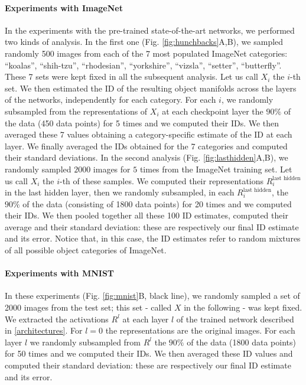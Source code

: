\documentclass{article}
\begin{document}
\paragraph{Experiments with ImageNet}

In the experiments with the pre-trained state-of-the-art networks, we performed two kinds of analysis. In the first one (Fig. \ref{fig:hunchbacks}A,B), we sampled randomly 500 images from each of the 7 most populated ImageNet categories: ``koalas'', ``shih-tzu'', ``rhodesian'', ``yorkshire'', ``vizsla'', ``setter'', ``butterfly''. These 7 sets were kept fixed in all the subsequent analysis. Let us call $X_i$ the $i$-th set.
We then estimated the ID of the resulting object manifolds across the layers of the networks, independently for each category. 
For each $i$, we randomly subsampled from the representations of $X_i$ at each checkpoint layer the $90\%$ of the data (450 data points) for 5 times and we computed their IDs. We then averaged these 7 values obtaining a category-specific estimate of the ID at each layer. 
We finally averaged the IDs obtained for the 7 categories and computed their standard deviations.
In the second analysis (Fig. \ref{fig:lasthidden}A,B), we randomly sampled $2000$ images for $5$ times from the ImageNet training set. Let us call $X_i$ the $i$-th of these samples. We computed their representations $R^{\text{last hidden}}_i$ in the last hidden layer, then we randomly subsampled, in each $R^{\text{last hidden}}_i$, the $90\%$ of the data (consisting of 1800 data points) for 20 times and we computed their IDs.
We then pooled together all these 100 ID estimates, computed their average and their standard deviation: these are respectively our final ID estimate and its error. Notice that, in this case, the ID estimates refer to random mixtures of all possible object categories of ImageNet.


\paragraph{Experiments with MNIST}

In these experiments (Fig. \ref{fig:mnist}B, black line), we randomly sampled a set of 2000 images from the test set; this set - called $X$ in the following - was kept fixed. We extracted the activations $R^l$ at each layer $l$ of the trained network described in \ref{architectures}. For $l=0$ the representations are the original images.
For each layer $l$ we randomly subsampled from $R^l$ the $90\%$ of the data (1800 data points) for 50 times and we computed their IDs. We then averaged these ID values and computed their standard deviation: these are respectively our final ID estimate and its error.
\end{document}
